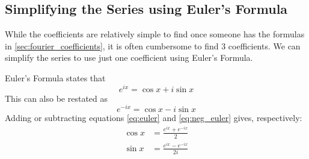 \documentclass[12pt, titlepage]{article}
\numberwithin{equation}{section}
\begin{document}
\subsection{Simplifying the Series using Euler's Formula}

While the coefficients are relatively simple to find once someone has the formulas in
\autoref{sec:fourier_coefficients}, it is often cumbersome to find 3 coefficients. We can
simplify the series to use just one coefficient using Euler's Formula.

Euler's Formula states that
%
\begin{equation} \label{eq:euler}
    e^{ix} = \cos{x} + i\sin{x}
\end{equation}
%
This can also be restated as 
%
\begin{equation} \label{eq:neg_euler}
    e^{-ix} = \cos{x} - i\sin{x}
\end{equation}
%
Adding or subtracting equations \eqref{eq:euler} and \eqref{eq:neg_euler} gives,
respectively:
%
\begin{align*}
    \cos{x} &= \frac{e^{ix} + e^{-ix}}{2} \label{eq:euler_cos}\\ 
    \sin{x} &= \frac{e^{ix} - e^{-ix}}{2i} \label{eq:euler_sin}
\end{align*}
%
\end{document}
